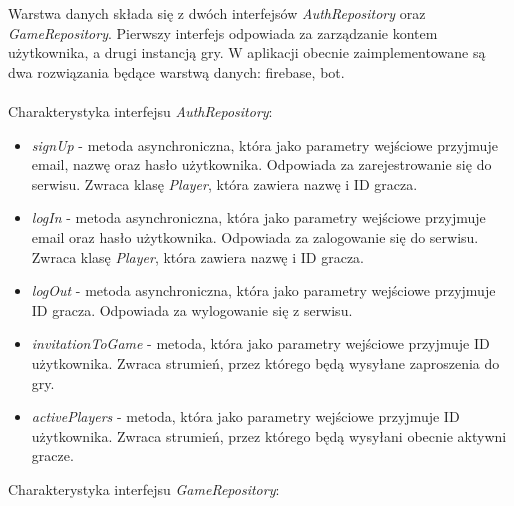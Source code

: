 Warstwa danych składa się z dwóch interfejsów \emph{AuthRepository} oraz \emph{GameRepository}. Pierwszy interfejs odpowiada za zarządzanie kontem użytkownika, a drugi instancją gry. W aplikacji obecnie zaimplementowane są dwa rozwiązania będące warstwą danych: firebase, bot. \\ \\
Charakterystyka interfejsu \emph{AuthRepository}:

\begin{itemize}
	\item \emph{signUp} - metoda asynchroniczna, która jako parametry wejściowe przyjmuje email, nazwę oraz hasło użytkownika. Odpowiada za zarejestrowanie się do serwisu. Zwraca klasę \emph{Player}, która zawiera nazwę i ID gracza.
	\item \emph{logIn} - metoda asynchroniczna, która jako parametry wejściowe przyjmuje email oraz hasło użytkownika. Odpowiada za zalogowanie się do serwisu. Zwraca klasę \emph{Player}, która zawiera nazwę i ID gracza.
	\item \emph{logOut} - metoda asynchroniczna, która jako parametry wejściowe przyjmuje ID gracza. Odpowiada za wylogowanie się z serwisu.
	\item \emph{invitationToGame} - metoda, która jako parametry wejściowe przyjmuje ID użytkownika. Zwraca strumień, przez którego będą wysyłane zaproszenia do gry.
	\item \emph{activePlayers} - metoda, która jako parametry wejściowe przyjmuje ID użytkownika. Zwraca strumień, przez którego będą wysyłani obecnie aktywni gracze. \\
\end{itemize}
Charakterystyka interfejsu \emph{GameRepository}:

